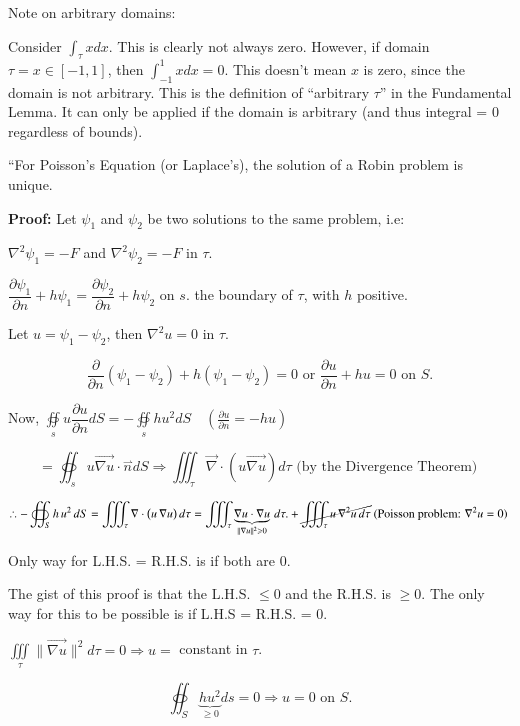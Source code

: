 \documentclass{report}
\begin{document}
Note on arbitrary domains:

Consider $\displaystyle\int_{\tau} x d x$. This is clearly not always zero. However, if domain $\tau=x \in[-1,1]$, then $\displaystyle\int_{-1}^{1} x d x=0$. This doesn't mean $x$ is zero, since the domain is not arbitrary. This is the definition of ``arbitrary $\tau$'' in the Fundamental Lemma. It can only be applied if the domain is arbitrary (and thus integral = 0 regardless of bounds).

``For Poisson's Equation (or Laplace's), the solution of a Robin problem is unique.

\textbf{Proof:} Let $\psi_{1}$ and $\psi_{2}$ be two solutions to the same problem, i.e:

$\nabla^{2} \psi_{1}=-F$ and $\nabla^{2} \psi_{2}=-F$ in $\tau$.

$\dfrac{\partial \psi_{1}}{\partial n}+h \psi_{1}=\dfrac{\partial \psi_{2}}{\partial n}+h \psi_{2}$ on $s$. the boundary of $\tau$, with $h$ positive.

Let $u=\psi_{1}-\psi_{2}$, then $\nabla^{2} u=0$ in $\tau$.

$$
\dfrac{\partial}{\partial n}\left(\psi_{1}-\psi_{2}\right)+h\left(\psi_{1}-\psi_{2}\right)=0 \text { or } \frac{\partial u}{\partial n}+h u=0 \text { on } S .
$$

Now, $\oiint\limits_{s} u \dfrac{\partial u}{\partial n} d S=-\oiint\limits_{s} h u^{2} d S \quad\left(\frac{\partial u}{\partial n}=-h u\right)$

$$
=\oiint_{s} u \overrightarrow{\nabla u} \cdot \stackrel{\rightharpoonup}{n} d S \Rightarrow\iiint_{\tau} \vec{\nabla} \cdot(u \overrightarrow{\nabla u}) d \tau \text { (by the Divergence Theorem) }
$$

$$
\therefore -\oiint_{S} h\,u^{2} \, dS 
= \iiint_{\tau} \nabla \cdot \bigl(u\,\nabla u\bigr)\, d\tau
= \iiint_\tau 
  \underbrace{\nabla u \cdot \nabla u}_{\|\nabla u\|^2 \geqslant 0} 
  \, d\tau.
+ \cancel{\iiint_{\tau} u\,\nabla^{2}u \, d\tau}
\text{ (Poisson problem: } \nabla^{2}u = 0\text{) }
$$

Only way for L.H.S. = R.H.S. is if both are $0$.

The gist of this proof is that the L.H.S. $\leqslant 0$ and the R.H.S. is $\geqslant 0$. The only way for this to be possible is if L.H.S = R.H.S. = 0.

$\iiint\limits_{\tau}\|\overrightarrow{\nabla u}\|^{2} d \tau=0 \Rightarrow u=$ constant in $\tau$.

$$
\oiint_{S} \underbrace{h u^{2}}_{\geqslant 0} d s=0 \Rightarrow u=0 \text { on } S.
$$
\end{document}
